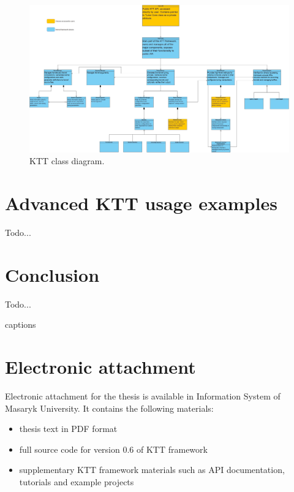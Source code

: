 \documentclass
[
    digital, %
    oneside, %
    table, %
    nolof, %
    nolot, %
    nocover %
]{fithesis3}
\begin{document}
\begin{figure}
\begin{adjustwidth}{-3.5cm}{-3.5cm}
\includegraphics[width=250mm]{resources/ktt_class_diagram.jpg}
\end{adjustwidth}
\caption{KTT class diagram.}
\label{ktt-class-diagram}
\end{figure}

\chapter{Advanced KTT usage examples}
\label{ktt-advanced-usage}
Todo...

\chapter{Conclusion}
Todo...

\csname captions\languagename\endcsname
\makeatletter
\thesis@selectLocale{\thesis@locale}\makeatother
\printbibliography[heading=bibintoc]

\appendix
\chapter{Electronic attachment}
Electronic attachment for the thesis is available in Information System of Masaryk University. It contains the following materials:
\begin{itemize}
    \item thesis text in PDF format
    \item full source code for version 0.6 of KTT framework
    \item supplementary KTT framework materials such as API documentation, tutorials and example projects
\end{itemize}
\end{document}
